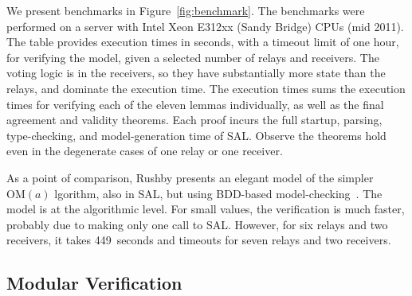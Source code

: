 \documentclass{llncs/llncs}
\newcommand{\OM}[1]{\ensuremath{\mathrm{OM}(#1)}\xspace}
\newcommand{\lee}[1]{ } %
\newcommand{\lee}[1]{ {\color{blue}$<$lee: #1$>$} } %
\begin{document}
{We present benchmarks in Figure~\ref{fig:benchmark}. The benchmarks were
performed on a server with Intel Xeon E312xx (Sandy Bridge) CPUs (mid 2011). The table provides execution times in seconds, with a timeout limit of one hour, for verifying the model, given a selected number of relays and receivers. The voting logic is in the receivers, so they have substantially more state than the relays, and dominate the execution time. The execution times sums the execution times for verifying each of the eleven lemmas individually, as well as the final agreement and validity theorems. Each proof incurs the full startup, parsing, type-checking, and model-generation time of SAL. Observe the theorems hold even in the degenerate cases of one relay or one receiver.

As a point of comparison, Rushby presents an elegant model of the simpler \OM algorithm, also in SAL, but using BDD-based model-checking~\cite{Rushby:OM1}. The model is at the algorithmic level. For small values, the verification is much faster, probably due to making only one call to SAL. However, for six relays and two receivers, it takes 449~seconds and timeouts for seven relays and two receivers.



\subsection{Modular Verification}\label{sec:modular}

}
\end{document}
